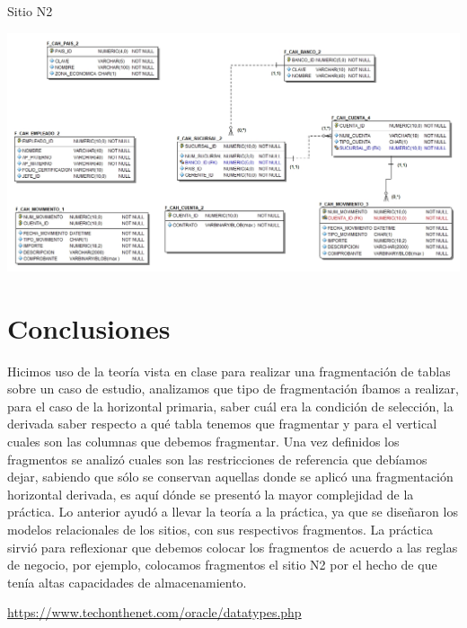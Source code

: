 \documentclass{article}
\begin{document}
\begin{landscape}
    \newpage
    {\LARGE Sitio N2 \par}
    \includegraphics[scale=0.5]{images/P4_N2.jpg}

    \end{landscape}

    \newpage
    
    \section{Conclusiones}
    Hicimos uso de la teoría vista en clase para realizar una fragmentación de tablas sobre un caso de estudio, analizamos que tipo de fragmentación íbamos a realizar, para el caso de la horizontal primaria, saber cuál era la condición de selección, la derivada saber respecto a qué tabla tenemos que fragmentar y para el vertical cuales son las columnas que debemos fragmentar. Una vez definidos los fragmentos se analizó cuales son las restricciones de referencia que debíamos dejar, sabiendo que sólo se conservan aquellas donde se aplicó una fragmentación horizontal derivada, es aquí dónde se presentó la mayor complejidad de la práctica. Lo anterior ayudó a llevar la teoría a la práctica, ya que se diseñaron los modelos relacionales de los sitios, con sus respectivos fragmentos. La práctica sirvió para reflexionar que debemos colocar los fragmentos de acuerdo a las reglas de negocio, por ejemplo, colocamos fragmentos el sitio N2 por el hecho de que tenía altas capacidades de almacenamiento. 
    
    \begin{thebibliography}{1}
 \url{https://www.techonthenet.com/oracle/datatypes.php}
\end{thebibliography}
\end{document}
